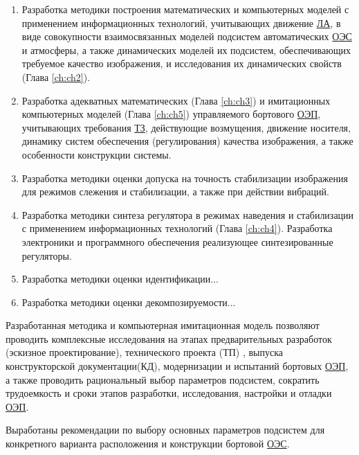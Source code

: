 \begin{enumerate}
\item Разработка методики построения математических и компьютерных моделей с применением информационных технологий, учитывающих движение  \hyperref[acroLA]{ЛА}, в виде совокупности взаимосвязанных моделей подсистем автоматических  \hyperref[acroEOS]{ОЭС} и атмосферы, а также динамических моделей их подсистем, обеспечивающих требуемое качество изображения, и исследования их динамических свойств (Глава \ref{ch:ch2}). 
\item Разработка адекватных математических (Глава \ref{ch:ch3}) и имитационных компьютерных моделей (Глава \ref{ch:ch5}) управляемого бортового  \hyperref[acroEOS]{ОЭП}, учитывающих требования  \hyperref[acroTZ]{ТЗ}, действующие возмущения, движение носителя, динамику систем обеспечения (регулирования) качества изображения, а также особенности конструкции системы. 
\item Разработка методики оценки  допуска на точность стабилизации изображения для режимов слежения и стабилизации, а также при действии вибраций.
\item Разработка методики синтеза регулятора в режимах наведения и стабилизации с применением информационных технологий (Глава \ref{ch:ch4}). Разработка электроники и программного обеспечения реализующее синтезированные регуляторы.
\item Разработка методики оценки идентификации...
\item Разработка методики оценки декомпозируемости...
\end{enumerate}

{\influence} 

Разработанная методика и компьютерная имитационная модель позволяют проводить комплексные исследования на этапах предварительных разработок (эскизное проектирование), технического проекта (ТП) , выпуска конструкторской документации(КД), модернизации и испытаний бортовых \hyperref[acroEOS]{ОЭП}, а также проводить рациональный выбор параметров подсистем, сократить трудоемкость и сроки этапов разработки, исследования, настройки и отладки \hyperref[acroEOS]{ОЭП}. 

Выработаны рекомендации по выбору основных параметров подсистем для конкретного варианта расположения и конструкции бортовой  \hyperref[acroEOS]{ОЭС}.

\begin{comment}
{\methods} \todo{методы исследования}\ldots
\end{comment}

